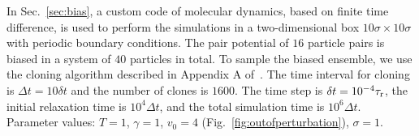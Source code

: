 \documentclass[pre, superscriptaddress, twocolumn,pre]{revtex4-1}
\begin{document}
In Sec.~\ref{sec:bias}, a custom code of molecular dynamics, based on finite time difference, is used to perform the simulations in a two-dimensional box $10\sigma\times 10\sigma$ with periodic boundary conditions. The pair potential of $16$ particle pairs is biased in a system of $40$ particles in total. To sample the biased ensemble, we use the cloning algorithm described in Appendix A of~\cite{Nemoto2016}. The time interval for cloning is $\Delta t = 10 \delta t$ and the number of clones is $1600$. The time step is $\delta t = 10^{-4} \tau_{\rm r}$, the initial relaxation time is $10^4\Delta t$, and the total simulation time is $10^6 \Delta t$. Parameter values: $T=1$, $\gamma=1$, $v_0=4$ (Fig.~\ref{fig:outofperturbation}), $\sigma=1$.


\end{document}
